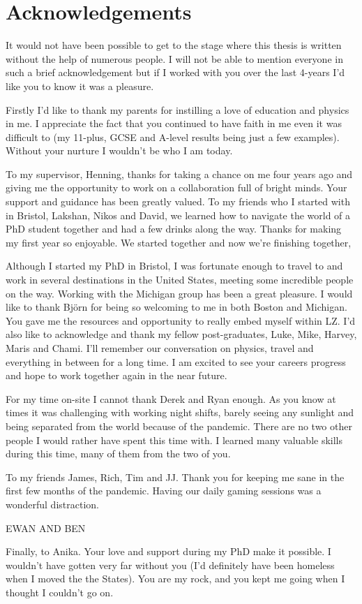 %
%

\chapter*{Acknowledgements}
\begin{SingleSpace}
\par
It would not have been possible to get to the stage where this thesis is written without the help of numerous people.
I will not be able to mention everyone in such a brief acknowledgement but if I worked with you over the last 4-years I'd like you to know it was a pleasure.
\par
Firstly I'd like to thank my parents for instilling a love of education and physics in me. I appreciate the fact that you continued to have faith in me even it was difficult to (my 11-plus, GCSE and A-level results being just a few examples).
Without your nurture I wouldn't be who I am today.
\par
To my supervisor, Henning, thanks for taking a chance on me four years ago and giving me the opportunity to work on a collaboration full of bright minds. 
Your support and guidance has been greatly valued.
To my friends who I started with in Bristol, Lakshan, Nikos and David, we learned how to navigate the world of a PhD student together and had a few drinks along the way. 
Thanks for making my first year so enjoyable.
We started together and now we're finishing together,
\par
Although I started my PhD in Bristol, I was fortunate enough to travel  to and work in several destinations in the United States, meeting some incredible people on the way. Working with the Michigan group has been a great pleasure. 
I would like to thank Bj\"{o}rn for being so welcoming to me in both Boston and Michigan.
You gave me the resources and opportunity to really embed myself within LZ.
I'd also like to acknowledge and thank my fellow post-graduates, Luke, Mike, Harvey, Maris and Chami. I'll remember our conversation on physics, travel and everything in between for a long time. I am excited to see your careers progress and hope to work together again in the near future.
\par
For my time on-site I cannot thank Derek and Ryan enough. As you know at times it was challenging with working night shifts, barely seeing any sunlight and being separated from the world because of the pandemic. There are no two other people I would rather have spent this time with. I learned many valuable skills during this time, many of them from the two of you. 
\par
To my friends James, Rich, Tim and JJ.
Thank you for keeping me sane in the first few months of the pandemic.
Having our daily gaming sessions was a wonderful distraction.
\par
EWAN AND BEN
\par
Finally, to Anika.
Your love and support during my PhD make it possible.
I wouldn't have gotten very far without you (I'd definitely have been homeless when I moved the the States).
You are my rock, and you kept me going when I thought I couldn't go on.
\end{SingleSpace}
\clearpage